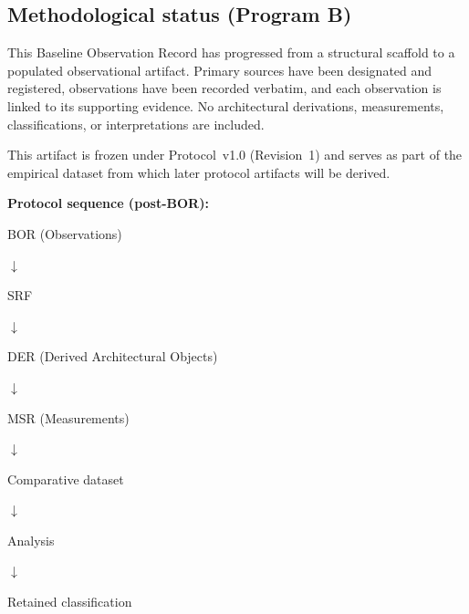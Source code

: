 \documentclass{article}
\begin{document}
\subsection*{Methodological status (Program B)}

This Baseline Observation Record has progressed from a structural scaffold to a populated observational artifact. Primary sources have been designated and registered, observations have been recorded verbatim, and each observation is linked to its supporting evidence. No architectural derivations, measurements, classifications, or interpretations are included.

This artifact is frozen under Protocol~v1.0 (Revision~1) and serves as part of the empirical dataset from which later protocol artifacts will be derived.

\noindent\textbf{Protocol sequence (post-BOR):}
\begin{center}
BOR (Observations)\par
$\downarrow$\par
SRF\par
$\downarrow$\par
DER (Derived Architectural Objects)\par
$\downarrow$\par
MSR (Measurements)\par
$\downarrow$\par
Comparative dataset\par
$\downarrow$\par
Analysis\par
$\downarrow$\par
Retained classification
\end{center}
\end{document}
